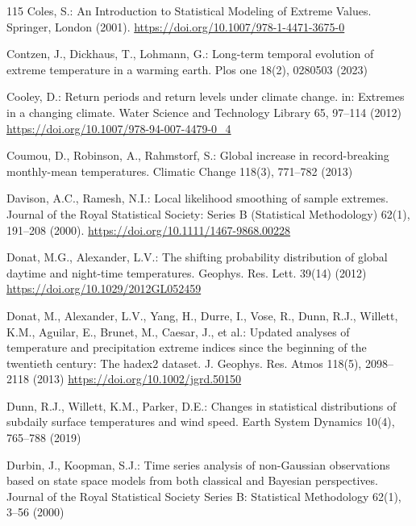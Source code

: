 \documentclass[11pt,a4paper]{article}
\begin{document}
\begin{thebibliography}{115}
		Coles, S.: An Introduction to Statistical Modeling of Extreme Values. Springer, London (2001). \url{https://doi.org/10.1007/978-1-4471-3675-0}
		
		Contzen, J., Dickhaus, T., Lohmann, G.: Long-term temporal evolution of extreme temperature in a warming earth. Plos one 18(2), 0280503 (2023)
		
		Cooley, D.: Return periods and return levels under climate change. in: Extremes in a changing climate. Water Science and Technology Library 65, 97--114 (2012) \url{https://doi.org/10.1007/978-94-007-4479-0_4}
		
		Coumou, D., Robinson, A., Rahmstorf, S.: Global increase in record-breaking monthly-mean temperatures. Climatic Change 118(3), 771--782 (2013)
		
		Davison, A.C., Ramesh, N.I.: Local likelihood smoothing of sample extremes. Journal of the Royal Statistical Society: Series B (Statistical Methodology) 62(1), 191--208 (2000). \url{https://doi.org/10.1111/1467-9868.00228}
		
		Donat, M.G., Alexander, L.V.: The shifting probability distribution of global daytime and night-time temperatures. Geophys. Res. Lett. 39(14) (2012) \url{https://doi.org/10.1029/2012GL052459}
		
		Donat, M., Alexander, L.V., Yang, H., Durre, I., Vose, R., Dunn, R.J., Willett, K.M., Aguilar, E., Brunet, M., Caesar, J., et al.: Updated analyses of temperature and precipitation extreme indices since the beginning of the twentieth century: The hadex2 dataset. J. Geophys. Res. Atmos 118(5), 2098--2118 (2013) \url{https://doi.org/10.1002/jgrd.50150}
		
		Dunn, R.J., Willett, K.M., Parker, D.E.: Changes in statistical distributions of subdaily surface temperatures and wind speed. Earth System Dynamics 10(4), 765--788 (2019)
		
		Durbin, J., Koopman, S.J.: Time series analysis of non-Gaussian observations based on state space models from both classical and Bayesian perspectives. Journal of the Royal Statistical Society Series B: Statistical Methodology 62(1), 3--56 (2000)
		

\end{thebibliography}
\end{document}
